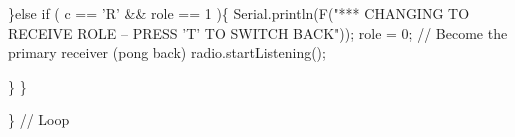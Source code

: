 \begin{DoxyCodeInclude}
   \}\textcolor{keywordflow}{else}
    \textcolor{keywordflow}{if} ( c == \textcolor{charliteral}{'R'} && role == 1 )\{
      Serial.println(F(\textcolor{stringliteral}{"*** CHANGING TO RECEIVE ROLE -- PRESS 'T' TO SWITCH BACK"}));      
       role = 0;                \textcolor{comment}{// Become the primary receiver (pong back)}
       radio.startListening();
       
    \}
  \}


\} \textcolor{comment}{// Loop}
\end{DoxyCodeInclude}
 